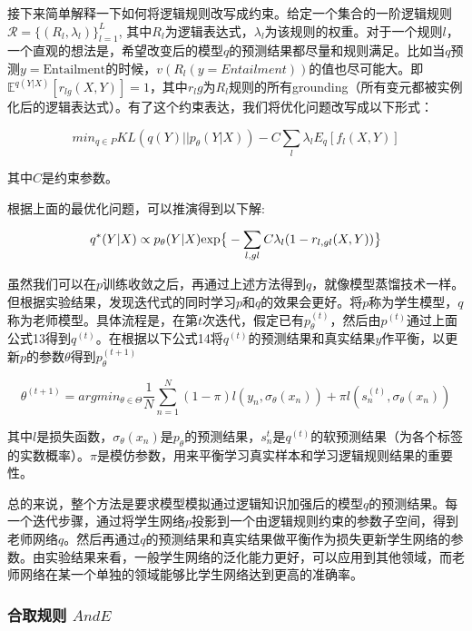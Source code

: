 \documentclass[UTF8,11pt,a4paper,nofonts]{ctexart}
\begin{document}
接下来简单解释一下如何将逻辑规则改写成约束。给定一个集合的一阶逻辑规则$\mathcal{R}=\{(R_l,\lambda_l)\}^L_{l=1}$, 其中$R_l$为逻辑表达式，$\lambda_l$为该规则的权重。对于一个规则$l$，一个直观的想法是，希望改变后的模型$q$的预测结果都尽量和规则满足。比如当$q$预测$y=\text{Entailment}$的时候，$v(R_l(y=Entailment))$的值也尽可能大。即$\mathbb{E}^{q(Y|X)}[r_{lg}(X,Y)]=1$，其中$r_lg$为$R_l$规则的所有grounding（所有变元都被实例化后的逻辑表达式）。有了这个约束表达，我们将优化问题改写成以下形式：

\begin{equation}
min_{q \in P} KL(q(Y)|| p_\theta(Y|X)) - C \sum_l \lambda_l E_q[f_l(X,Y)]
\end{equation}

其中$C$是约束参数。

根据上面的最优化问题，可以推演得到以下解\cite{Hu2016HarnessingDN}:

\begin{equation}
q^*(Y|X) \propto p_\theta(Y|X) \text{exp} \big{\{} -\sum_{l,gl}C\lambda_l(1-r_{l,gl}(X,Y)) \big{\}}
\end{equation}

虽然我们可以在$p$训练收敛之后，再通过上述方法得到$q$，就像模型蒸馏技术\cite{Hinton2015DistillingTK, LopezPaz2015UnifyingDA}一样。但根据实验结果，发现迭代式的同时学习$p$和$q$的效果会更好。\cite{Hu2016HarnessingDN}将$p$称为学生模型，$q$称为老师模型。具体流程是，在第$t$次迭代，假定已有$p_\theta^{(t)}$，然后由$p^{(t)}$通过上面公式13得到$q^{(t)}$。在根据以下公式14将$q^{(t)}$的预测结果和真实结果$y$作平衡，以更新$p$的参数$\theta$得到$p_\theta^{(t+1)}$

\begin{equation}
\theta^{(t+1)} = argmin_{\theta\in \Theta} \frac{1}{N}\sum^N_{n=1}(1-\pi)l(y_n,\sigma_\theta(x_n)) + \pi l(s^{(t)}_n,\sigma_\theta(x_n)) 
\end{equation}

其中$l$是损失函数，$\sigma_\theta(x_n)$是$p_\theta$的预测结果，$s_n^{t}$是$q^{(t)}$的软预测结果（为各个标签的实数概率）。$\pi$是模仿参数，用来平衡学习真实样本和学习逻辑规则结果的重要性。

总的来说，整个方法是要求模型模拟通过逻辑知识加强后的模型$q$的预测结果。每一个迭代步骤，通过将学生网络$p$投影到一个由逻辑规则约束的参数子空间，得到老师网络$q$。然后再通过$q$的预测结果和真实结果做平衡作为损失更新学生网络的参数。由实验结果来看，一般学生网络的泛化能力更好，可以应用到其他领域，而老师网络在某一个单独的领域能够比学生网络达到更高的准确率。

\subsubsection{合取规则 $AndE$}
\end{document}
